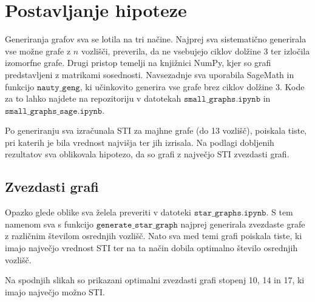 \documentclass[a4paper,12pt]{article}
\begin{document}
\newpage

\section{Postavljanje hipoteze}
Generiranja grafov sva se lotila na tri načine. Najprej sva sistematično generirala vse možne grafe z $n$ vozlišči,
preverila, da ne vsebujejo ciklov dolžine 3 ter izločila izomorfne grafe. Drugi pristop temelji na knjižnici NumPy, kjer so grafi 
predstavljeni z matrikami sosednosti. Navsezadnje sva uporabila SageMath in funkcijo $\texttt{nauty\_geng}$, ki učinkovito generira
vse grafe brez ciklov dolžine 3. Kode za to lahko najdete na repozitoriju v datotekah $\texttt{small\_graphs.ipynb}$ in 
$\texttt{small\_graphs\_sage.ipynb}$.

Po generiranju sva izračunala STI za majhne grafe (do 13 vozlišč), poiskala tiste, pri katerih je bila vrednost najvišja ter jih izrisala. 
Na podlagi dobljenih rezultatov sva oblikovala hipotezo, da so grafi z največjo STI zvezdasti grafi.

\subsection{Zvezdasti grafi}
Opazko glede oblike sva želela preveriti v datoteki $\texttt{star\_graphs.ipynb}$. S tem  namenom sva s funkcijo $\texttt{generate\_star\_graph}$
najprej generirala zvezdaste grafe z različnim številom osrednjih vozlišč. Nato sva med temi grafi poiskala tiste, ki imajo največjo vrednost STI 
ter na ta način dobila optimalno število osrednjih vozlišč. 

Na spodnjih slikah so prikazani optimalni zvezdasti grafi stopenj 10, 14 in 17, ki imajo največjo možno STI.
\end{document}
